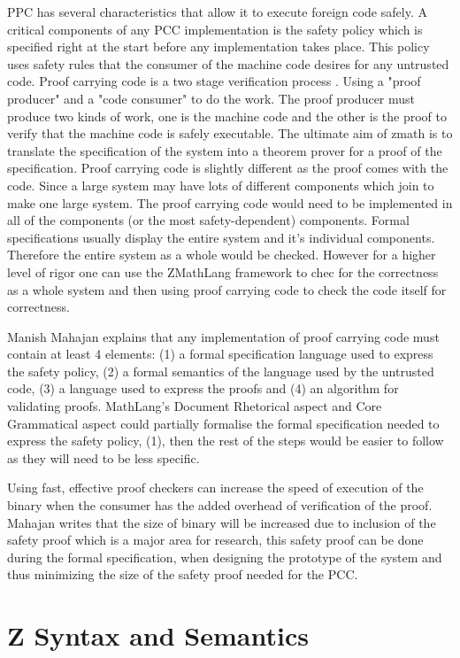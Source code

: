 PPC has several characteristics that allow it to execute foreign code safely. A critical components of any PCC implementation is the safety policy which is specified right at the start before any implementation takes place. This policy uses safety rules that the consumer of the machine code desires for any untrusted code. Proof carrying code is a two stage verification process \cite{suappc}. Using a "proof producer" and a "code consumer" to do the work. The proof producer must produce two kinds of work, one is the machine code and the other is the proof to verify that the machine code is safely executable. The ultimate aim of \gls{zmath} is to translate the specification of the system into a theorem prover for a proof of the specification. Proof carrying code is slightly different as the proof comes with the code. Since a large system may have lots of different components which join to make one large system. The proof carrying code would need to be implemented in all of the components (or the most safety-dependent) components. Formal specifications usually display the entire system and it's individual components. Therefore the entire system as a whole would be checked. However for a higher level of rigor one can use the ZMathLang framework to chec for the correctness as a whole system and then using proof carrying code to check the code itself for correctness.

Manish Mahajan \cite{pccman} explains that any implementation of proof carrying code must contain at least 4 elements: (1) a formal specification language used to express the safety policy, (2) a formal semantics of the language used by the untrusted code, (3) a language used to express the proofs and (4) an algorithm for validating proofs. MathLang's Document Rhetorical aspect and Core Grammatical aspect could partially formalise the formal specification needed to express the safety policy, (1), then the rest of the steps would be easier to follow as they will need to be less specific.

Using fast, effective proof checkers can increase the speed of execution of the binary when the consumer has the added overhead of verification of the proof. Mahajan writes that the size of binary will be increased due to inclusion of the safety proof which is a major area for research, this safety proof can be done during the formal specification, when designing the prototype of the system and thus minimizing the size of the safety proof needed for the PCC.

\section{Z Syntax and Semantics}

